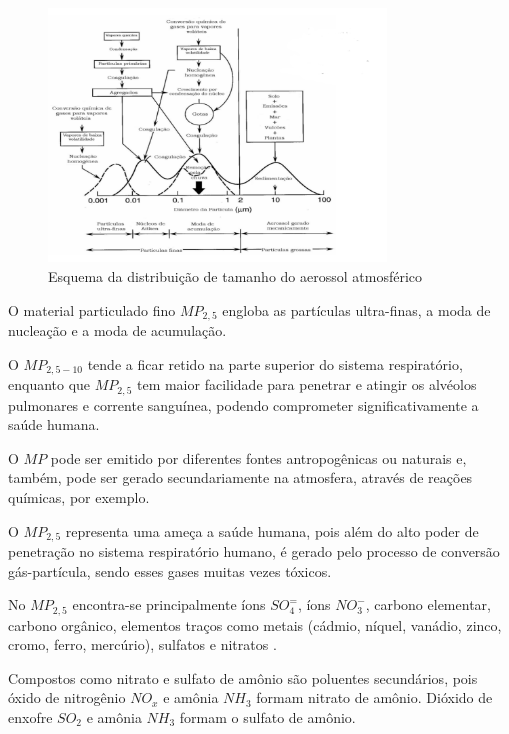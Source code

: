 \begin{figure}[H]
\begin{center}
  \includegraphics[width=0.8\textwidth]{../inputs/images/modas_aerossol.png}
  \caption{Esquema da distribuição de tamanho do aerossol atmosférico 
           \citep{finlayson1999} \label{fig:modas_aerossol}}
\end{center}
\end{figure}

O material particulado fino $MP_{2,5}$ engloba as partículas 
ultra-finas, a moda de nucleação e a moda de acumulação.  

O $MP_{2,5-10}$ tende a ficar retido na parte superior do sistema respiratório, 
enquanto que $MP_{2,5}$ tem maior facilidade para penetrar e atingir 
os alvéolos pulmonares e corrente sanguínea, 
podendo comprometer significativamente a saúde humana. 

O $MP$ pode ser emitido por diferentes fontes antropogênicas ou naturais e, 
também, pode ser gerado secundariamente na atmosfera, através de 
reações químicas, por exemplo. 

O $MP_{2,5}$ representa uma ameça a saúde humana, pois além 
do alto poder de penetração no sistema respiratório humano,
é gerado pelo processo de conversão gás-partícula, sendo esses 
gases muitas vezes tóxicos.

No $MP_{2,5}$ encontra-se principalmente íons $SO_4^=$, 
íons $ NO_3^-$, carbono elementar, carbono orgânico, 
elementos traços como metais 
(cádmio, níquel, vanádio, zinco, cromo, ferro, mercúrio), 
sulfatos e nitratos \citep{finlayson1999}. 

Compostos como nitrato e sulfato de amônio são poluentes secundários,
pois óxido de nitrogênio $NO_x$ e amônia $NH_3$ formam nitrato de amônio. 
Dióxido de enxofre $SO_2$ e amônia $NH_3$ formam o sulfato de amônio. 

